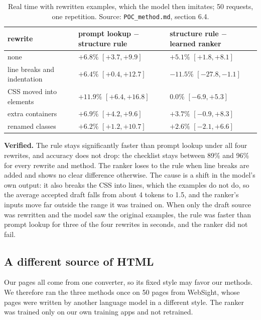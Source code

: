 \documentclass[10pt,a4paper]{article}
\begin{document}
\begin{table}[H]\centering\small
\caption{Real time with rewritten examples, which the model then imitates; 50 requests, one repetition. Source: \texttt{POC\_method.md}, section 6.4.}\label{tab:p1}
\begin{tabular}{lll}
\toprule
rewrite & prompt lookup $-$ structure rule & structure rule $-$ learned ranker\\
\midrule
none & $+6.8\%$ $[+3.7, +9.9]$ & $+5.1\%$ $[+1.8, +8.1]$\\
line breaks and indentation & $+6.4\%$ $[+0.4, +12.7]$ & $-11.5\%$ $[-27.8, -1.1]$\\
CSS moved into elements & $+11.9\%$ $[+6.4, +16.8]$ & $0.0\%$ $[-6.9, +5.3]$\\
extra containers & $+6.9\%$ $[+4.2, +9.6]$ & $+3.7\%$ $[-0.9, +8.3]$\\
renamed classes & $+6.2\%$ $[+1.2, +10.7]$ & $+2.6\%$ $[-2.1, +6.6]$\\
\bottomrule
\end{tabular}
\end{table}
\textbf{Verified.} The rule stays significantly faster than prompt lookup under all four rewrites, and accuracy does not drop: the checklist stays between 89\% and 96\% for every rewrite and method. The ranker loses to the rule when line breaks are added and shows no clear difference otherwise. The cause is a shift in the model's own output: it also breaks the CSS into lines, which the examples do not do, so the average accepted draft falls from about 4 tokens to 1.5, and the ranker's inputs move far outside the range it was trained on. When only the draft source was rewritten and the model saw the original examples, the rule was faster than prompt lookup for three of the four rewrites in seconds, and the ranker did not fail.

\subsection{A different source of HTML}
Our pages all come from one converter, so its fixed style may favor our methods. We therefore ran the three methods once on 50 pages from WebSight, whose pages were written by another language model in a different style. The ranker was trained only on our own training apps and not retrained.
\end{document}

